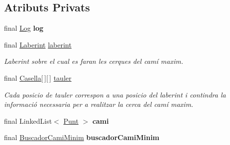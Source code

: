 \subsection*{Atributs Privats}
\begin{DoxyCompactItemize}
\item 
\hypertarget{classlogica_1_1algoritmica_1_1_back_tracking_1_1_solucio_af58725b92b2197de9f2bf4852885c9b8}{final \hyperlink{classlogica_1_1log_1_1_log}{Log} {\bfseries log}}\label{classlogica_1_1algoritmica_1_1_back_tracking_1_1_solucio_af58725b92b2197de9f2bf4852885c9b8}

\item 
\hypertarget{classlogica_1_1algoritmica_1_1_back_tracking_1_1_solucio_a978c78c185cc1937c869fbbf64dbca66}{final \hyperlink{classlogica_1_1laberints_1_1_laberint}{Laberint} \hyperlink{classlogica_1_1algoritmica_1_1_back_tracking_1_1_solucio_a978c78c185cc1937c869fbbf64dbca66}{laberint}}\label{classlogica_1_1algoritmica_1_1_back_tracking_1_1_solucio_a978c78c185cc1937c869fbbf64dbca66}

\begin{DoxyCompactList}\small\item\em Laberint sobre el cual es faran les cerques del camí maxim. \end{DoxyCompactList}\item 
\hypertarget{classlogica_1_1algoritmica_1_1_back_tracking_1_1_solucio_abb4b1b2f358a83b83f378793cc3dae5e}{final \hyperlink{classlogica_1_1algoritmica_1_1_casella}{Casella}\mbox{[}$\,$\mbox{]}\mbox{[}$\,$\mbox{]} \hyperlink{classlogica_1_1algoritmica_1_1_back_tracking_1_1_solucio_abb4b1b2f358a83b83f378793cc3dae5e}{tauler}}\label{classlogica_1_1algoritmica_1_1_back_tracking_1_1_solucio_abb4b1b2f358a83b83f378793cc3dae5e}

\begin{DoxyCompactList}\small\item\em Cada posicio de tauler correspon a una posicio del laberint i contindra la informació necessaria per a realitzar la cerca del camí maxim. \end{DoxyCompactList}\item 
\hypertarget{classlogica_1_1algoritmica_1_1_back_tracking_1_1_solucio_ae2b0d11413ef996f1776dc95d5a6062c}{final Linked\+List$<$ \hyperlink{classlogica_1_1_punt}{Punt} $>$ {\bfseries cami}}\label{classlogica_1_1algoritmica_1_1_back_tracking_1_1_solucio_ae2b0d11413ef996f1776dc95d5a6062c}

\item 
\hypertarget{classlogica_1_1algoritmica_1_1_back_tracking_1_1_solucio_a8c60ae3118875b492fbc0bd9774b77ed}{final \hyperlink{classlogica_1_1algoritmica_1_1_a_estrella_1_1_buscador_cami_minim}{Buscador\+Cami\+Minim} {\bfseries buscador\+Cami\+Minim}}\label{classlogica_1_1algoritmica_1_1_back_tracking_1_1_solucio_a8c60ae3118875b492fbc0bd9774b77ed}


\end{DoxyCompactItemize}
